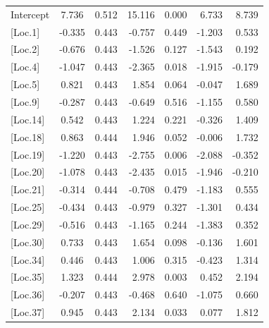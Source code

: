 \begin{longtable}{@{\extracolsep{\fill}}p{2.8cm}clrrrr@{}}
	Intercept       & 7.736  & 0.512 & 15.116 & 0.000 & 6.733  & 8.739  \\
	{[}Loc.1{]}     & -0.335 & 0.443 & -0.757 & 0.449 & -1.203 & 0.533  \\
	{[}Loc.2{]}     & -0.676 & 0.443 & -1.526 & 0.127 & -1.543 & 0.192  \\
	 \setrow{\bfseries} {[}Loc.4{]}     & \setrow{\bfseries}  -1.047 & \setrow{\bfseries}  0.443 & \setrow{\bfseries}  -2.365 & \setrow{\bfseries}  0.018 & \setrow{\bfseries}  -1.915 & \setrow{\bfseries}  -0.179 \\
	{[}Loc.5{]}     & 0.821  & 0.443 & 1.854  & 0.064 & -0.047 & 1.689  \\
	{[}Loc.9{]}     & -0.287 & 0.443 & -0.649 & 0.516 & -1.155 & 0.580  \\
	{[}Loc.14{]}    & 0.542  & 0.443 & 1.224  & 0.221 & -0.326 & 1.409  \\
	{[}Loc.18{]}    & 0.863  & 0.444 & 1.946  & 0.052 & -0.006 & 1.732  \\
	 \setrow{\bfseries} {[}Loc.19{]}    & \setrow{\bfseries}  -1.220 & \setrow{\bfseries}  0.443 & \setrow{\bfseries}  -2.755 & \setrow{\bfseries}  0.006 & \setrow{\bfseries}  -2.088 & \setrow{\bfseries}  -0.352 \\
	 \setrow{\bfseries} {[}Loc.20{]}    & \setrow{\bfseries}  -1.078 & \setrow{\bfseries}  0.443 & \setrow{\bfseries}  -2.435 & \setrow{\bfseries}  0.015 & \setrow{\bfseries}  -1.946 & \setrow{\bfseries}  -0.210 \\
	{[}Loc.21{]}    & -0.314 & 0.444 & -0.708 & 0.479 & -1.183 & 0.555  \\
	{[}Loc.25{]}    & -0.434 & 0.443 & -0.979 & 0.327 & -1.301 & 0.434  \\
	{[}Loc.29{]}    & -0.516 & 0.443 & -1.165 & 0.244 & -1.383 & 0.352  \\
	{[}Loc.30{]}    & 0.733  & 0.443 & 1.654  & 0.098 & -0.136 & 1.601  \\
	{[}Loc.34{]}    & 0.446  & 0.443 & 1.006  & 0.315 & -0.423 & 1.314  \\
	 \setrow{\bfseries} {[}Loc.35{]}    & \setrow{\bfseries}  1.323  & \setrow{\bfseries}  0.444 & \setrow{\bfseries}  2.978  & \setrow{\bfseries}  0.003 & \setrow{\bfseries}  0.452  & \setrow{\bfseries}  2.194  \\
	{[}Loc.36{]}    & -0.207 & 0.443 & -0.468 & 0.640 & -1.075 & 0.660  \\
	 \setrow{\bfseries} {[}Loc.37{]}    & \setrow{\bfseries}  0.945  & \setrow{\bfseries}  0.443 & \setrow{\bfseries}  2.134  & \setrow{\bfseries}  0.033 & \setrow{\bfseries}  0.077  & \setrow{\bfseries}  1.812  \\

\end{longtable}

